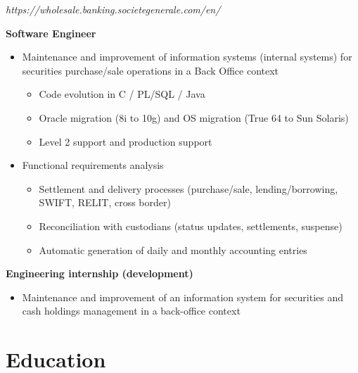 \documentclass[11pt,a4paper]{moderncv}
\begin{document}
\newpage

{
	\textit{https://wholesale.banking.societegenerale.com/en/}

	\bigskip
	\textbf{Software Engineer}
\bigskip
\begin{itemize}
\item Maintenance and improvement of information systems (internal systems) for securities purchase/sale operations in a Back Office context
	\begin{itemize}
		\item Code evolution in C / PL/SQL / Java
		\item Oracle migration (8i to 10g) and OS migration (True 64 to Sun Solaris)
		\item Level 2 support and production support
\end{itemize}
\bigskip
\item Functional requirements analysis
	\begin{itemize}
		\item Settlement and delivery processes (purchase/sale, lending/borrowing, SWIFT, RELIT, cross border)
		\item Reconciliation with custodians (status updates, settlements, suspense)
		\item Automatic generation of daily and monthly accounting entries
	\end{itemize}
\end{itemize}
}
\bigskip
{}
{
\bigskip
\textbf{Engineering internship (development)}
\bigskip
\begin{itemize}
	\item Maintenance and improvement of an information system for securities and cash holdings management in a back-office context
\end{itemize}
}
\section{Education}


\end{document}
